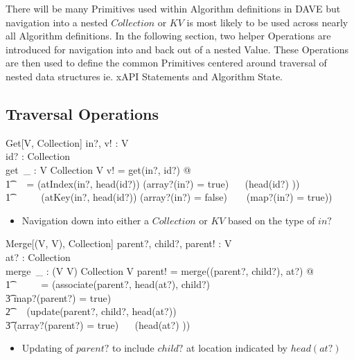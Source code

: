 \documentclass[../main.tex]{subfiles}
\begin{document}
There will be many Primitives used within Algorithm definitions in DAVE but
navigation into a nested $Collection$ or $KV$ is most likely to be used
across nearly all Algorithm definitions. In the following section,
two helper Operations are introduced for navigation into and back out of a
nested Value. These Operations are then used to define the common Primitives centered around
traversal of nested data structures ie. xAPI Statements and Algorithm State.

\subsection{Traversal Operations}
\begin{schema}{Get[V, Collection]}
  in?, v! : V \\
  id? : Collection \\
  get~\_ : V \cross Collection \surj V
  \where
  v! = get(in?, id?) @\\
  \t1 \ ~  = (atIndex(in?, head(id?)) \iff (array?(in?) = true) ~\land~ (head(id?) \in \nat)) ~\lor \\
  \t1 \ \ \ \ ~ (atKey(in?, head(id?)) \iff (array?(in?) = false) ~ \land ~ (map?(in?) = true))
\end{schema}
\begin{itemize}
  \item Navigation down into either a $Collection$ or $KV$ based on the type of $in?$
\end{itemize}
\begin{schema}{Merge[(V, V), Collection]}
  parent?, child?, parent! : V \\
  at? : Collection \\
  merge~\_ : (V \cross V) \cross Collection \bij V
  \where
  parent! = merge((parent?, child?), at?) @ \\
  \t1 \ \ \ \ ~ = (associate(parent?, head(at?), child?) \\
  \t3 \iff map?(parent?) = true) ~ \lor \\
  \t2 \ ~ (update(parent?, child?, head(at?)) \\
  \t3 \iff (array?(parent?) = true) ~\land~ (head(at?) \in \nat))
\end{schema}
\begin{itemize}
  \item Updating of $parent?$ to include $child?$ at location indicated by $head(at?)$
\end{itemize}
\end{document}
